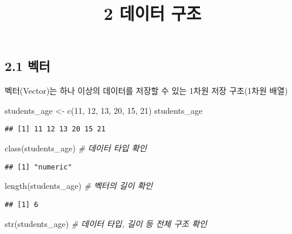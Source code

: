 \documentclass[
]{article}
\title{2 데이터 구조}
\author{}
\date{\vspace{-2.5em}}
\newenvironment{Shaded}{\begin{snugshade}}{\end{snugshade}}
\newcommand{\CommentTok}[1]{\textcolor[rgb]{0.56,0.35,0.01}{\textit{#1}}}
\newcommand{\DecValTok}[1]{\textcolor[rgb]{0.00,0.00,0.81}{#1}}
\newcommand{\FunctionTok}[1]{\textcolor[rgb]{0.00,0.00,0.00}{#1}}
\newcommand{\NormalTok}[1]{#1}
\newcommand{\OtherTok}[1]{\textcolor[rgb]{0.56,0.35,0.01}{#1}}
\begin{document}
\maketitle

\hypertarget{uxbca1uxd130}{%
\subsection{2.1 벡터}\label{uxbca1uxd130}}

벡터(Vector)는 하나 이상의 데이터를 저장할 수 있는 1차원 저장 구조(1차원
배열)

\begin{Shaded}
\begin{Highlighting}[]
\NormalTok{students\_age }\OtherTok{\textless{}{-}} \FunctionTok{c}\NormalTok{(}\DecValTok{11}\NormalTok{, }\DecValTok{12}\NormalTok{, }\DecValTok{13}\NormalTok{, }\DecValTok{20}\NormalTok{, }\DecValTok{15}\NormalTok{, }\DecValTok{21}\NormalTok{)}
\NormalTok{students\_age}
\end{Highlighting}
\end{Shaded}

\begin{verbatim}
## [1] 11 12 13 20 15 21
\end{verbatim}

\begin{Shaded}
\begin{Highlighting}[]
\FunctionTok{class}\NormalTok{(students\_age)   }\CommentTok{\# 데이터 타입 확인}
\end{Highlighting}
\end{Shaded}

\begin{verbatim}
## [1] "numeric"
\end{verbatim}

\begin{Shaded}
\begin{Highlighting}[]
\FunctionTok{length}\NormalTok{(students\_age)  }\CommentTok{\# 벡터의 길이 확인}
\end{Highlighting}
\end{Shaded}

\begin{verbatim}
## [1] 6
\end{verbatim}

\begin{Shaded}
\begin{Highlighting}[]
\FunctionTok{str}\NormalTok{(students\_age)     }\CommentTok{\# 데이터 타입, 길이 등 전체 구조 확인}
\end{Highlighting}
\end{Shaded}
\end{document}
